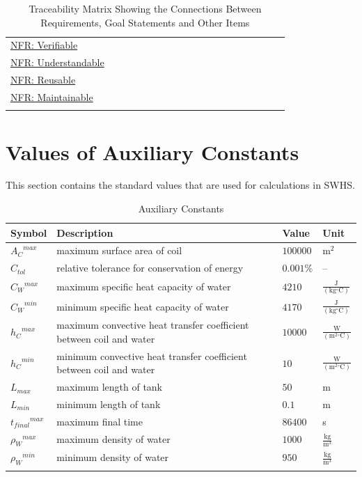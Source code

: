 \documentclass[12pt]{article}
\begin{document}
\begin{longtable}{l l l l l l l l l l l l l l l l l l l}
\\
\hyperref[verifiable]{NFR: Verifiable} &  &  &  &  &  &  &  &  &  &  &  &  &  &  &  &  &  & 
\\
\hyperref[understandable]{NFR: Understandable} &  &  &  &  &  &  &  &  &  &  &  &  &  &  &  &  &  & 
\\
\hyperref[reusable]{NFR: Reusable} &  &  &  &  &  &  &  &  &  &  &  &  &  &  &  &  &  & 
\\
\hyperref[maintainable]{NFR: Maintainable} &  &  &  &  &  &  &  &  &  &  &  &  &  &  &  &  &  & 
\\
\bottomrule
\caption{Traceability Matrix Showing the Connections Between Requirements, Goal Statements and Other Items}
\label{Table:TraceMatAllvsR}
\end{longtable}
\section{Values of Auxiliary Constants}
\label{Sec:AuxConstants}
This section contains the standard values that are used for calculations in SWHS.

\begin{longtabu}{l X[l] l l}
\toprule
\textbf{Symbol} & \textbf{Description} & \textbf{Value} & \textbf{Unit}
\\
\midrule
\endhead
${{A_{C}}^{max}}$ & maximum surface area of coil & $100000$ & $\text{m}^{2}$
\\
${C_{tol}}$ & relative tolerance for conservation of energy & $0.001\%$ & --
\\
${{C_{W}}^{max}}$ & maximum specific heat capacity of water & $4210$ & $\frac{\text{J}}{(\text{kg}{}^{\circ}\text{C})}$
\\
${{C_{W}}^{min}}$ & minimum specific heat capacity of water & $4170$ & $\frac{\text{J}}{(\text{kg}{}^{\circ}\text{C})}$
\\
${{h_{C}}^{max}}$ & maximum convective heat transfer coefficient between coil and water & $10000$ & $\frac{\text{W}}{(\text{m}^{2}{}^{\circ}\text{C})}$
\\
${{h_{C}}^{min}}$ & minimum convective heat transfer coefficient between coil and water & $10$ & $\frac{\text{W}}{(\text{m}^{2}{}^{\circ}\text{C})}$
\\
${L_{max}}$ & maximum length of tank & $50$ & m
\\
${L_{min}}$ & minimum length of tank & $0.1$ & m
\\
${{t_{final}}^{max}}$ & maximum final time & $86400$ & s
\\
${{ρ_{W}}^{max}}$ & maximum density of water & $1000$ & $\frac{\text{kg}}{\text{m}^{3}}$
\\
${{ρ_{W}}^{min}}$ & minimum density of water & $950$ & $\frac{\text{kg}}{\text{m}^{3}}$
\\
\bottomrule
\caption{Auxiliary Constants}
\label{Table:TAuxConsts}
\end{longtabu}
\end{document}
